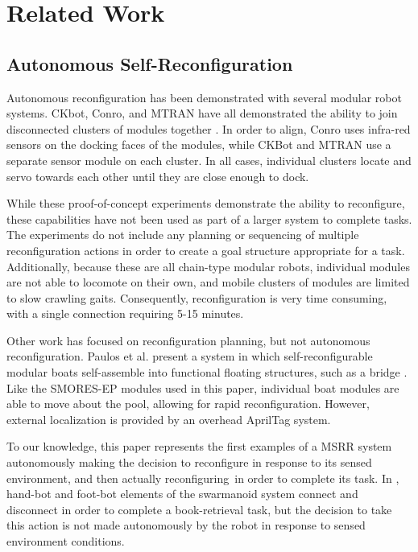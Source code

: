 \documentclass[conference]{IEEEtran}
\begin{document}
\section{Related Work}\label{sec:related-work}
\subsection{Autonomous Self-Reconfiguration}
\label{autonomous-self-reconfiguration}
%
Autonomous reconfiguration has been demonstrated with several modular robot systems. CKbot, Conro, and MTRAN have all demonstrated the ability to join disconnected clusters of modules together \cite{Yim2007, Rubenstein2004,Murata2006}. In order to align, Conro uses infra-red sensors on the docking faces of the modules, while CKBot and MTRAN use a separate sensor module on each cluster.  In all cases, individual clusters locate and servo towards each other until they are close enough to dock.

While these proof-of-concept experiments demonstrate the ability to reconfigure, these capabilities have not been used as part of a larger system to complete tasks. The experiments do not include any planning or sequencing of multiple reconfiguration actions in order to create a goal structure appropriate for a task.  Additionally, because these are all chain-type modular robots, individual modules are not able to locomote on their own, and mobile clusters of modules are limited to slow crawling gaits.  Consequently, reconfiguration is very time consuming, with a single connection requiring 5-15 minutes.

Other work has focused on reconfiguration planning, but not autonomous reconfiguration.  Paulos et al. present a system in which self-reconfigurable modular boats self-assemble into functional floating structures, such as a bridge \cite{Paulos2015}.  Like the SMORES-EP modules used in this paper, individual boat modules are able to move about the pool, allowing for rapid reconfiguration.  However, external localization is provided by an overhead AprilTag system. 

To our knowledge, this paper represents the first examples of a MSRR system autonomously making the decision to reconfigure in response to its sensed environment, and then actually reconfiguring\ in order to complete its task.  In \cite{Dorigo2013}, hand-bot and foot-bot elements of the swarmanoid system connect and disconnect in order to complete a book-retrieval task, but the decision to take this action is not made autonomously by the robot in response to sensed environment conditions.
%
\end{document}
